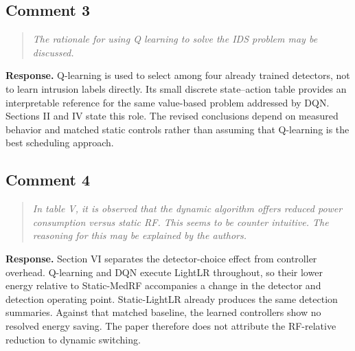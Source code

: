 \documentclass[11pt,a4paper]{article}
\newenvironment{comment}{\begin{quote}\small\itshape}{\end{quote}}
\newcommand{\response}{\noindent\textbf{Response.} }
\begin{document}
\subsection*{Comment 3}
\begin{comment}
The rationale for using Q learning to solve the IDS problem may be discussed.
\end{comment}
\response Q-learning is used to select among four already trained detectors, not to learn intrusion labels directly. Its small discrete state--action table provides an interpretable reference for the same value-based problem addressed by DQN. Sections II and IV state this role. The revised conclusions depend on measured behavior and matched static controls rather than assuming that Q-learning is the best scheduling approach.

\subsection*{Comment 4}
\begin{comment}
In table V, it is observed that the dynamic algorithm offers reduced power consumption versus static RF. This seems to be counter intuitive. The reasoning for this may be explained by the authors.
\end{comment}
\response Section VI separates the detector-choice effect from controller overhead. Q-learning and DQN execute LightLR throughout, so their lower energy relative to Static-MedRF accompanies a change in the detector and detection operating point. Static-LightLR already produces the same detection summaries. Against that matched baseline, the learned controllers show no resolved energy saving. The paper therefore does not attribute the RF-relative reduction to dynamic switching.
\end{document}
